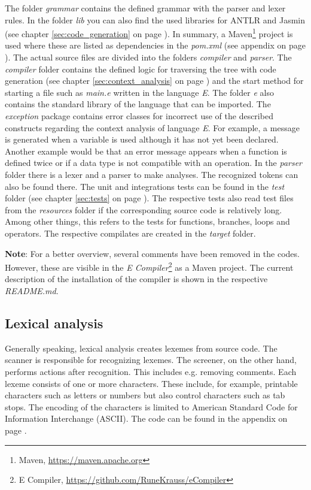 The folder \emph{grammar} contains the defined grammar with the parser and lexer rules. In the folder \emph{lib} you can also find the used libraries for ANTLR and Jasmin (see chapter \ref{sec:code_generation} on page \pageref{sec:code_generation}). In summary, a Maven\footnote{Maven, \url{https://maven.apache.org}} project is used where these are listed as dependencies in the \emph{pom.xml} (see appendix on page \pageref{sec:maven}). The actual source files are divided into the folders \emph{compiler} and \emph{parser}. The \emph{compiler} folder contains the defined logic for traversing the tree with code generation (see chapter \ref{sec:context_analysis} on page \pageref{sec:context_analysis}) and the start method for starting a file such as \emph{main.e} written in the language \emph{E}. The folder \emph{e} also contains the standard library of the language that can be imported. The \emph{exception} package contains error classes for incorrect use of the described constructs regarding the context analysis of language \emph{E}. For example, a message is generated when a variable is used although it has not yet been declared. Another example would be that an error message appears when a function is defined twice or if a data type is not compatible with an operation. In the \emph{parser} folder there is a lexer and a parser to make analyses. The recognized tokens can also be found there. The unit and integrations tests can be found in the \emph{test} folder (see chapter \ref{sec:tests} on page \pageref{sec:tests}). The respective tests also read test files from the \emph{resources} folder if the corresponding source code is relatively long. Among other things, this refers to the tests for functions, branches, loops and operators. The respective compilates are created in the \emph{target} folder.

\textbf{Note}: For a better overview, several comments have been removed in the codes. However, these are visible in the \emph{E Compiler}\footnote{E Compiler, \url{https://github.com/RuneKrauss/eCompiler}} as a Maven project. The current description of the installation of the compiler is shown in the respective \emph{README.md}.

\subsection{Lexical analysis}
\label{sec:lexical_analysis}

Generally speaking, lexical analysis creates lexemes from source code. The scanner is responsible for recognizing lexemes. The screener, on the other hand, performs actions after recognition. This includes e.g. removing comments. Each lexeme consists of one or more characters. These include, for example, printable characters such as letters or numbers but also control characters such as tab stops. The encoding of the characters is limited to American Standard Code for Information Interchange (ASCII). The code can be found in the appendix on page \pageref{sec:ascii}.

